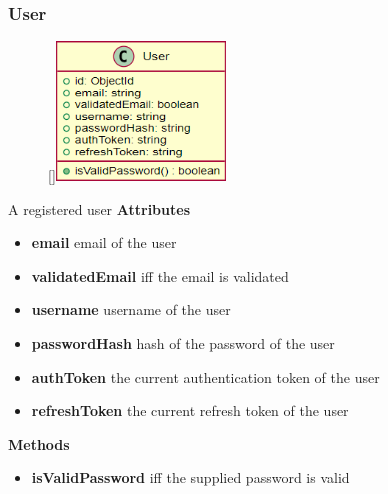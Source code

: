 \subsubsection{User}
\begin{figure}
    \raisebox{0pt}[\dimexpr{}\baselineskip\relax]{\includegraphics[width=4.5cm]{classes/auth/2.png}}
\end{figure} 
\par
A registered user
\newline
\newline
\textbf{Attributes}
\begin{itemize}
    \item \textbf{email} email of the user
    \item \textbf{validatedEmail} iff the email is validated
    \item \textbf{username} username of the user
    \item \textbf{passwordHash} hash of the password of the user
    \item \textbf{authToken} the current authentication token of the user
    \item \textbf{refreshToken} the current refresh token of the user
\end{itemize}
\textbf{Methods}
\begin{itemize}
    \item \textbf{isValidPassword} iff the supplied password is valid
\end{itemize}

